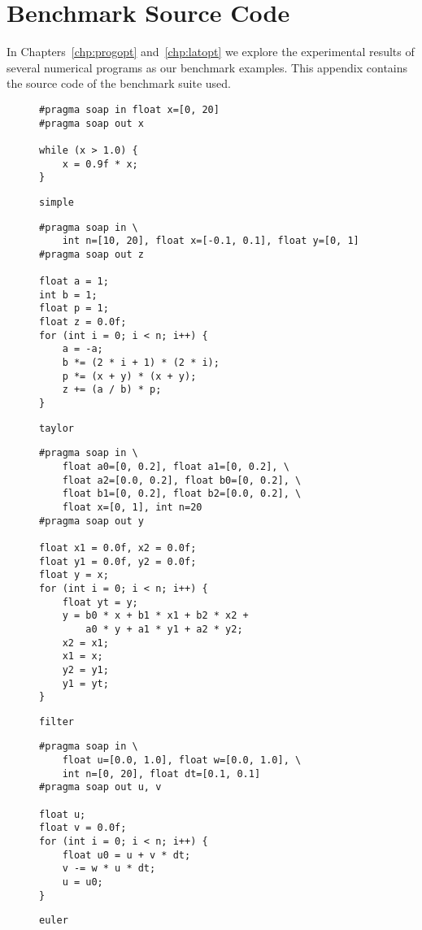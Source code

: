 \chapter{Benchmark Source Code}
\label{app:source}

In Chapters~\ref{chp:progopt} and~\ref{chp:latopt} we explore the experimental
results of several numerical programs as our benchmark examples.  This appendix
contains the source code of the benchmark suite used.

\begin{figure}[ht]
\begin{lstlisting}
#pragma soap in float x=[0, 20]
#pragma soap out x

while (x > 1.0) {
    x = 0.9f * x;
}
\end{lstlisting}
\caption{\texttt{simple}}
\end{figure}

\begin{figure}[ht]
\begin{lstlisting}
#pragma soap in \
    int n=[10, 20], float x=[-0.1, 0.1], float y=[0, 1]
#pragma soap out z

float a = 1;
int b = 1;
float p = 1;
float z = 0.0f;
for (int i = 0; i < n; i++) {
    a = -a;
    b *= (2 * i + 1) * (2 * i);
    p *= (x + y) * (x + y);
    z += (a / b) * p;
}
\end{lstlisting}
\caption{\texttt{taylor}}
\end{figure}

\begin{figure}[ht]
\begin{lstlisting}
#pragma soap in \
    float a0=[0, 0.2], float a1=[0, 0.2], \
    float a2=[0.0, 0.2], float b0=[0, 0.2], \
    float b1=[0, 0.2], float b2=[0.0, 0.2], \
    float x=[0, 1], int n=20
#pragma soap out y

float x1 = 0.0f, x2 = 0.0f;
float y1 = 0.0f, y2 = 0.0f;
float y = x;
for (int i = 0; i < n; i++) {
    float yt = y;
    y = b0 * x + b1 * x1 + b2 * x2 +
        a0 * y + a1 * y1 + a2 * y2;
    x2 = x1;
    x1 = x;
    y2 = y1;
    y1 = yt;
}
\end{lstlisting}
\caption{\texttt{filter}}
\end{figure}

\begin{figure}[ht]
\begin{lstlisting}
#pragma soap in \
    float u=[0.0, 1.0], float w=[0.0, 1.0], \
    int n=[0, 20], float dt=[0.1, 0.1]
#pragma soap out u, v

float u;
float v = 0.0f;
for (int i = 0; i < n; i++) {
    float u0 = u + v * dt;
    v -= w * u * dt;
    u = u0;
}
\end{lstlisting}
\caption{\texttt{euler}}
\end{figure}

